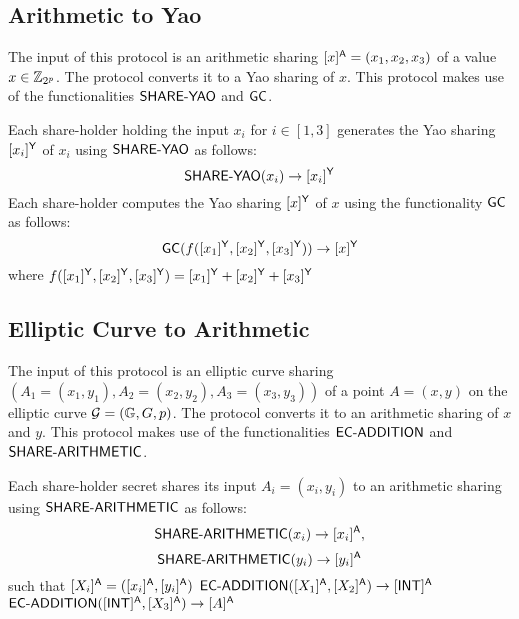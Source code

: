 \subsection{Arithmetic to Yao}
\begin{algorithm}[H]
\renewcommand{\thealgorithm}{}
\caption{$[x]^\Arithmetic \rightarrow [x]^\Yao$}
\label{protocol1}
The input of this protocol is an arithmetic sharing $[x]^{\mathsf{A}} = (x_1, x_2, x_3)$ of a value $x \in \mathbb{Z}_{2^p}$. The protocol converts it to a Yao sharing of $x$. This protocol makes use of the functionalities $\mathsf{SHARE\mbox{-}YAO}$ and $\mathsf{GC}$.
\smallskip
\begin{algorithmic}[1]
\STATE Each share-holder holding the input $x_i$ for $i \in [1, 3]$ generates the Yao sharing $[x_i]^{\mathsf{Y}}$ of $x_i$ using $\mathsf{SHARE\mbox{-}YAO}$ as follows:
\begin{equation*}
    \mathsf{SHARE\mbox{-}YAO}(x_i) \rightarrow [x_i]^{\mathsf{Y}}
\end{equation*}
\STATE Each share-holder computes the Yao sharing $[x]^{\mathsf{Y}}$ of $x$ using the functionality $\mathsf{GC}$ as follows:
\begin{equation*}
    \mathsf{GC}(f([x_1]^{\mathsf{Y}}, [x_2]^{\mathsf{Y}}, [x_3]^{\mathsf{Y}})) \rightarrow [x]^{\mathsf{Y}}
\end{equation*}
where $f([x_1]^{\mathsf{Y}}, [x_2]^{\mathsf{Y}}, [x_3]^{\mathsf{Y}}) = [x_1]^{\mathsf{Y}} + [x_2]^{\mathsf{Y}} + [x_3]^{\mathsf{Y}}$
\end{algorithmic}
\end{algorithm}


\subsection{Elliptic Curve to Arithmetic}
\begin{algorithm}[H]
\renewcommand{\thealgorithm}{}
\caption{$[A]^\EllipticCurve \rightarrow [A]^\Arithmetic$}
\label{protocol1}
The input of this protocol is an elliptic curve sharing $(A_1 = (x_1, y_1), A_2 = (x_2, y_2), A_3 = (x_3, y_3))$ of a point $A = (x, y)$ on the elliptic curve $\mathcal{G} = (\mathbb{G}, G, p)$. The protocol converts it to an arithmetic sharing of $x$ and $y$. This protocol makes use of the functionalities $\mathsf{EC\mbox{-}ADDITION}$ and $\mathsf{SHARE\mbox{-}ARITHMETIC}$.
\smallskip
\begin{algorithmic}[1]
\STATE Each share-holder secret shares its input $A_i = (x_i, y_i)$ to an arithmetic sharing using $\mathsf{SHARE\mbox{-}ARITHMETIC}$ as follows:
\begin{equation*}
    \mathsf{SHARE\mbox{-}ARITHMETIC}(x_i) \rightarrow [x_i]^{\mathsf{A}},
\end{equation*}
\begin{equation*}
    \mathsf{SHARE\mbox{-}ARITHMETIC}(y_i) \rightarrow [y_i]^{\mathsf{A}}
\end{equation*} such that $[X_i]^{\mathsf{A}} = ([x_i]^{\mathsf{A}}, [y_i]^{\mathsf{A}})$
\medskip
\STATE $\mathsf{EC\mbox{-}ADDITION}([X_1]^{\mathsf{A}}, [X_2]^{\mathsf{A}}) \rightarrow [\mathsf{INT}]^{\mathsf{A}}$
\medskip
\STATE $\mathsf{EC\mbox{-}ADDITION}([\mathsf{INT}]^{\mathsf{A}}, [X_3]^{\mathsf{A}}) \rightarrow [A]^{\mathsf{A}}$
\end{algorithmic}
\end{algorithm}

